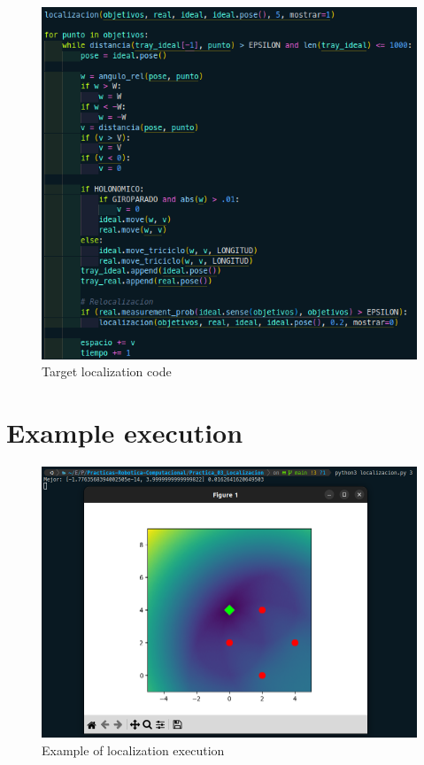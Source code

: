 \documentclass[11pt]{report}
\begin{document}
\begin{figure}[H]
  \centering
  \includegraphics[scale=0.45]{img/localizacion_objetivos.png}
  \caption{Target localization code}
\end{figure}

\newpage

\section{Example execution}
\begin{figure}[H]
  \centering
  \includegraphics[scale=0.42]{img/localizacion_0.png}
  \caption{Example of localization execution}
\end{figure}
\end{document}
